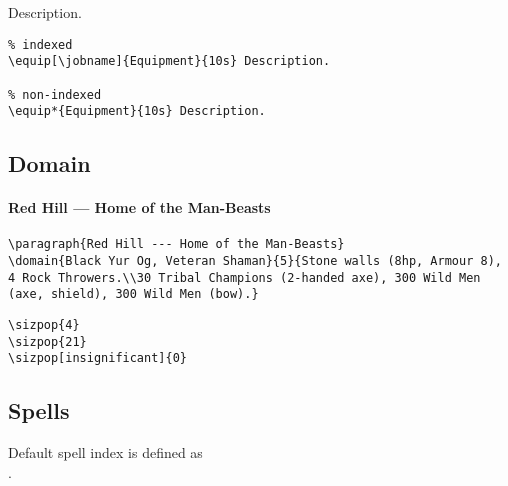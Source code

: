 \documentclass[itdr]{subfiles}
\begin{document}
 Description.
\begin{lstlisting}
% indexed
\equip[\jobname]{Equipment}{10s} Description.

% non-indexed
\equip*{Equipment}{10s} Description.
\end{lstlisting}

\vfill

\subsection{Domain}

\paragraph{Red Hill --- Home of the Man-Beasts}

\skipline[0.5\baselineskip]

\begin{lstlisting}
\paragraph{Red Hill --- Home of the Man-Beasts}
\domain{Black Yur Og, Veteran Shaman}{5}{Stone walls (8hp, Armour 8), 4 Rock Throwers.\\30 Tribal Champions (2-handed axe), 300 Wild Men (axe, shield), 300 Wild Men (bow).}
\end{lstlisting}




\begin{lstlisting}
\sizpop{4}
\sizpop{21}
\sizpop[insignificant]{0}
\end{lstlisting}

\break

\subsection{Spells}

Default spell index is defined as\\.
\end{document}

